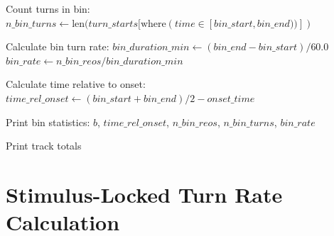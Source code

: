 \documentclass[
  11pt,
]{article}
\begin{document}
\begin{algorithm}[H]
\begin{algorithmic}[1]
        \STATE Count turns in bin:
        \STATE \quad $n\_bin\_turns \leftarrow \text{len}(turn\_starts[\text{where}(time \in [bin\_start, bin\_end))])$
        
        \STATE Calculate bin turn rate:
        \STATE \quad $bin\_duration\_min \leftarrow (bin\_end - bin\_start) / 60.0$
        \STATE \quad $bin\_rate \leftarrow n\_bin\_reos / bin\_duration\_min$
        
        \STATE Calculate time relative to onset:
        \STATE \quad $time\_rel\_onset \leftarrow (bin\_start + bin\_end)/2 - onset\_time$
        
        \STATE Print bin statistics: $b$, $time\_rel\_onset$, $n\_bin\_reos$, $n\_bin\_turns$, $bin\_rate$
    \ENDFOR
\ENDFOR

\STATE Print track totals
\end{algorithmic}
\end{algorithm}

\hypertarget{stimulus-locked-turn-rate-calculation}{%
\section{Stimulus-Locked Turn Rate
Calculation}\label{stimulus-locked-turn-rate-calculation}}
\end{document}
